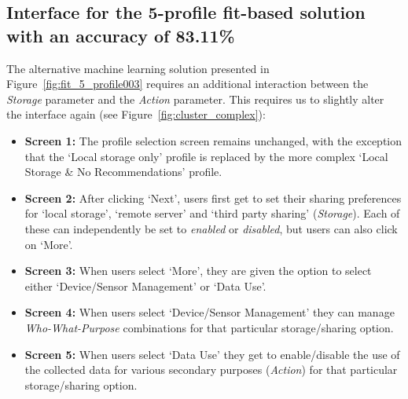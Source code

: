\subsection{Interface for the 5-profile fit-based solution with an accuracy of 83.11\%}\label{sec:fit_complex}
The alternative machine learning solution presented in Figure~\ref{fig:fit_5_profile003} requires an additional interaction between the \emph{Storage} parameter and the \emph{Action} parameter. This requires us to slightly alter the interface again (see Figure~\ref{fig:cluster_complex}): 
\begin{itemize}
	\item \textbf{Screen 1:} The profile selection screen remains unchanged, with the exception that the `Local storage only' profile is replaced by the more complex `Local Storage \& No Recommendations' profile.
	\item \textbf{Screen 2:} After clicking `Next', users first get to set their sharing preferences for `local storage', `remote server' and `third party sharing' (\emph{Storage}). Each of these can independently be set to \emph{enabled} or \emph{disabled}, but users can also click on `More'.
	\item \textbf{Screen 3:} When users select `More', they are given the option to select either `Device/Sensor Management' or `Data Use'.
	\item \textbf{Screen 4:} When users select `Device/Sensor Management' they can manage \emph{Who-What-Purpose} combinations for that particular storage/sharing option.
	\item \textbf{Screen 5:} When users select `Data Use' they get to enable/disable the use of the collected data for various secondary purposes (\emph{Action}) for that particular storage/sharing option. 
\end{itemize}


